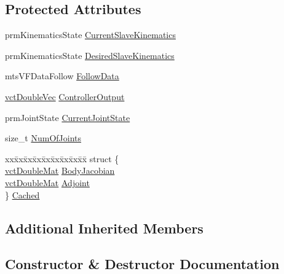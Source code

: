 \subsection*{Protected Attributes}
\begin{DoxyCompactItemize}
\item 
prm\+Kinematics\+State \hyperlink{classmts_intuitive_research_kit_optimizer_a10517be9e248c92c46501f6eea30433c}{Current\+Slave\+Kinematics}
\item 
prm\+Kinematics\+State \hyperlink{classmts_intuitive_research_kit_optimizer_a095ebf16dfbac51a8d8c24830824b856}{Desired\+Slave\+Kinematics}
\item 
mts\+V\+F\+Data\+Follow \hyperlink{classmts_intuitive_research_kit_optimizer_a08aabafa6727fbfa54b229e0faa21bdf}{Follow\+Data}
\item 
\hyperlink{vct_dynamic_vector_types_8h_ade4b3068c86fb88f41af2e5187e491c2}{vct\+Double\+Vec} \hyperlink{classmts_intuitive_research_kit_optimizer_ac33e4d294b5b6abee6863f070b477c42}{Controller\+Output}
\item 
prm\+Joint\+State \hyperlink{classmts_intuitive_research_kit_optimizer_ad436ec7283125c4598fcb243f0354e29}{Current\+Joint\+State}
\item 
size\+\_\+t \hyperlink{classmts_intuitive_research_kit_optimizer_aa64f574f639972c9ef2ce46db04c48f6}{Num\+Of\+Joints}
\item 
\begin{tabbing}
xx\=xx\=xx\=xx\=xx\=xx\=xx\=xx\=xx\=\kill
struct \{\\
\>\hyperlink{vct_dynamic_matrix_types_8h_a48f1eb2461d20a99e824ee5753a37c84}{vctDoubleMat} \hyperlink{classmts_intuitive_research_kit_optimizer_abfe8527a15da180a73c60e761ac889bb}{BodyJacobian}\\
\>\hyperlink{vct_dynamic_matrix_types_8h_a48f1eb2461d20a99e824ee5753a37c84}{vctDoubleMat} \hyperlink{classmts_intuitive_research_kit_optimizer_a84bd5de92e87e58310b54fa83fe8faf3}{Adjoint}\\
\} \hyperlink{classmts_intuitive_research_kit_optimizer_a44919bd63f06f71c6438842d38d94416}{Cached}\\

\end{tabbing}\end{DoxyCompactItemize}
\subsection*{Additional Inherited Members}


\subsection{Constructor \& Destructor Documentation}
\hypertarget{classmts_intuitive_research_kit_optimizer_af160a886afc7ade0e09a70492774604d}{}
